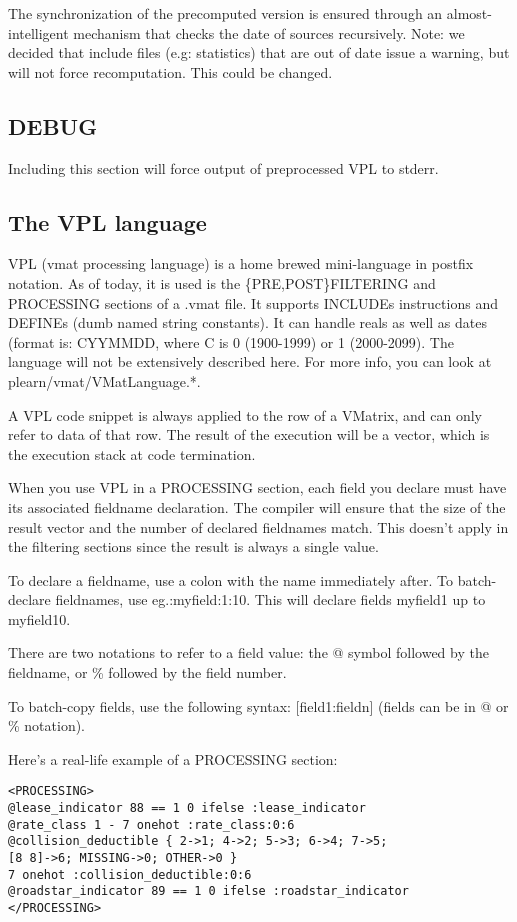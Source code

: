 \documentclass[11pt]{book}
\begin{document}
The synchronization of the precomputed version is ensured through an almost-intelligent mechanism that checks the date of sources recursively. Note: we decided that include files (e.g: statistics) that are out of date issue a warning, but will not force recomputation. This could be changed. 

\subsection{DEBUG}
Including this section will force output of preprocessed VPL to stderr.

\subsection{The VPL language}
VPL (vmat processing language) is a home brewed mini-language in postfix notation. As of today, it is used is the \{PRE,POST\}FILT\-ERING and PROCESSING sections of a .vmat file. It supports INCLUDEs instructions and DEFINEs (dumb named string constants). It can handle reals as well as dates (format is: CYYMMDD, where C is 0 (1900-1999) or 1 (2000-2099). The language will not be extensively described here. For more info, you can look at
plearn/vmat/VMatLanguage.*. 

A VPL code snippet is always applied to the row of a VMatrix, and can only refer to data of that row. The result of the execution will be a vector, which is the execution stack at code termination. 

When you use VPL in a PROCESSING section, each field you declare must have its associated fieldname declaration. The compiler will ensure that the size of the result vector and the number of declared fieldnames match. This doesn't apply in the filtering sections since the result is always a single value. 

To declare a fieldname, use a colon with the name immediately after. To batch-declare fieldnames, use eg.:myfield:1:10. This will declare fields myfield1 up to myfield10.

There are two notations to refer to a field value: the @ symbol followed by the fieldname, or \% followed by the field number.

To batch-copy fields, use the following syntax: [field1:fieldn] (fields can be in @ or \% notation).

Here's a real-life example of a PROCESSING section:

\begin{verbatim}
<PROCESSING>
@lease_indicator 88 == 1 0 ifelse :lease_indicator
@rate_class 1 - 7 onehot :rate_class:0:6
@collision_deductible { 2->1; 4->2; 5->3; 6->4; 7->5; 
[8 8]->6; MISSING->0; OTHER->0 }
7 onehot :collision_deductible:0:6
@roadstar_indicator 89 == 1 0 ifelse :roadstar_indicator
</PROCESSING>
\end{verbatim}
\end{document}
